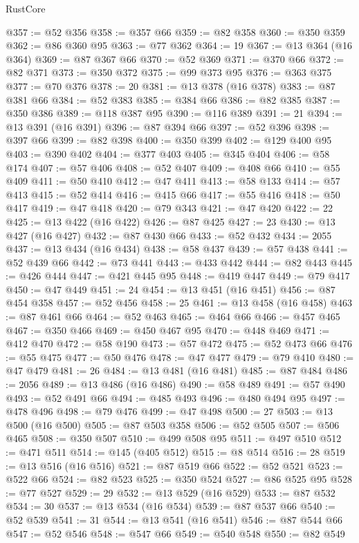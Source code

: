 \begin{lexlean}{RustCore}
\begin{coremodule}
@357 := @52 @356
@358 := @357 @66
@359 := @82 @358
@360 := @350 @359
@362 := @86 @360 @95
@363 := @77 @362
@364 := 19
@367 := @13 @364 (@16 @364)
@369 := @87 @367 @66
@370 := @52 @369
@371 := @370 @66
@372 := @82 @371
@373 := @350 @372
@375 := @99 @373 @95
@376 := @363 @375
@377 := @70 @376
@378 := 20
@381 := @13 @378 (@16 @378)
@383 := @87 @381 @66
@384 := @52 @383
@385 := @384 @66
@386 := @82 @385
@387 := @350 @386
@389 := @118 @387 @95
@390 := @116 @389
@391 := 21
@394 := @13 @391 (@16 @391)
@396 := @87 @394 @66
@397 := @52 @396
@398 := @397 @66
@399 := @82 @398
@400 := @350 @399
@402 := @129 @400 @95
@403 := @390 @402
@404 := @377 @403
@405 := @345 @404
@406 := @58 @174
@407 := @57 @406
@408 := @52 @407
@409 := @408 @66
@410 := @55 @409
@411 := @50 @410
@412 := @47 @411
@413 := @58 @133
@414 := @57 @413
@415 := @52 @414
@416 := @415 @66
@417 := @55 @416
@418 := @50 @417
@419 := @47 @418
@420 := @79 @343
@421 := @47 @420
@422 := 22
@425 := @13 @422 (@16 @422)
@426 := @87 @425
@427 := 23
@430 := @13 @427 (@16 @427)
@432 := @87 @430 @66
@433 := @52 @432
@434 := 2055
@437 := @13 @434 (@16 @434)
@438 := @58 @437
@439 := @57 @438
@441 := @52 @439 @66
@442 := @73 @441
@443 := @433 @442
@444 := @82 @443
@445 := @426 @444
@447 := @421 @445 @95
@448 := @419 @447
@449 := @79 @417
@450 := @47 @449
@451 := 24
@454 := @13 @451 (@16 @451)
@456 := @87 @454 @358
@457 := @52 @456
@458 := 25
@461 := @13 @458 (@16 @458)
@463 := @87 @461 @66
@464 := @52 @463
@465 := @464 @66
@466 := @457 @465
@467 := @350 @466
@469 := @450 @467 @95
@470 := @448 @469
@471 := @412 @470
@472 := @58 @190
@473 := @57 @472
@475 := @52 @473 @66
@476 := @55 @475
@477 := @50 @476
@478 := @47 @477
@479 := @79 @410
@480 := @47 @479
@481 := 26
@484 := @13 @481 (@16 @481)
@485 := @87 @484
@486 := 2056
@489 := @13 @486 (@16 @486)
@490 := @58 @489
@491 := @57 @490
@493 := @52 @491 @66
@494 := @485 @493
@496 := @480 @494 @95
@497 := @478 @496
@498 := @79 @476
@499 := @47 @498
@500 := 27
@503 := @13 @500 (@16 @500)
@505 := @87 @503 @358
@506 := @52 @505
@507 := @506 @465
@508 := @350 @507
@510 := @499 @508 @95
@511 := @497 @510
@512 := @471 @511
@514 := @145 (@405 @512)
@515 := @8 @514
@516 := 28
@519 := @13 @516 (@16 @516)
@521 := @87 @519 @66
@522 := @52 @521
@523 := @522 @66
@524 := @82 @523
@525 := @350 @524
@527 := @86 @525 @95
@528 := @77 @527
@529 := 29
@532 := @13 @529 (@16 @529)
@533 := @87 @532
@534 := 30
@537 := @13 @534 (@16 @534)
@539 := @87 @537 @66
@540 := @52 @539
@541 := 31
@544 := @13 @541 (@16 @541)
@546 := @87 @544 @66
@547 := @52 @546
@548 := @547 @66
@549 := @540 @548
@550 := @82 @549

\end{coremodule}
\end{lexlean}
